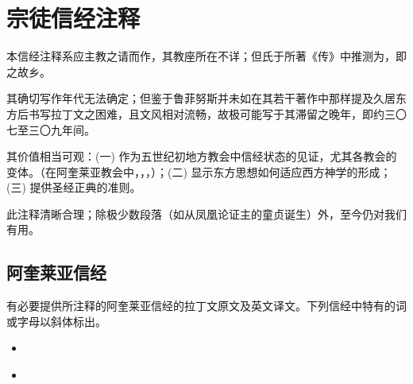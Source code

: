 
\chapter{宗徒信经注释}


本信经注释系应主教之请而作，其教座所在不详；但氏于所著《传》中推测为，即之故乡。\par

其确切写作年代无法确定；但鉴于鲁菲努斯并未如在其若干著作中那样提及久居东方后书写拉丁文之困难，且文风相对流畅，故极可能写于其滞留之晚年，即约三〇七至三〇九年间。\par

其价值相当可观：(一) 作为五世纪初地方教会中信经状态的见证，尤其各教会的变体。（在阿奎莱亚教会中，，，）；(二) 显示东方思想如何适应西方神学的形成；(三) 提供圣经正典的准则。\par

此注释清晰合理；除极少数段落（如从凤凰论证主的童贞诞生）外，至今仍对我们有用。\par


\section{阿奎莱亚信经}

有必要提供所注释的阿奎莱亚信经的拉丁文原文及英文译文。下列信经中特有的词或字母以斜体标出。\par

\begin{itemize}
\item {}
\end{itemize}

\begin{itemize}
\item {}
\end{itemize}

